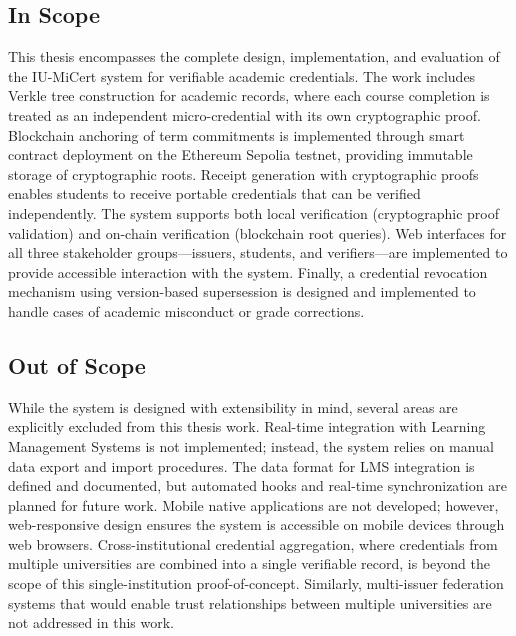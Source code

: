 \subsection{In Scope}
This thesis encompasses the complete design, implementation, and evaluation of the IU-MiCert system for verifiable academic credentials. The work includes Verkle tree construction for academic records, where each course completion is treated as an independent micro-credential with its own cryptographic proof. Blockchain anchoring of term commitments is implemented through smart contract deployment on the Ethereum Sepolia testnet, providing immutable storage of cryptographic roots. Receipt generation with cryptographic proofs enables students to receive portable credentials that can be verified independently. The system supports both local verification (cryptographic proof validation) and on-chain verification (blockchain root queries). Web interfaces for all three stakeholder groups—issuers, students, and verifiers—are implemented to provide accessible interaction with the system. Finally, a credential revocation mechanism using version-based supersession is designed and implemented to handle cases of academic misconduct or grade corrections.

\subsection{Out of Scope}
While the system is designed with extensibility in mind, several areas are explicitly excluded from this thesis work. Real-time integration with Learning Management Systems is not implemented; instead, the system relies on manual data export and import procedures. The data format for LMS integration is defined and documented, but automated hooks and real-time synchronization are planned for future work. Mobile native applications are not developed; however, web-responsive design ensures the system is accessible on mobile devices through web browsers. Cross-institutional credential aggregation, where credentials from multiple universities are combined into a single verifiable record, is beyond the scope of this single-institution proof-of-concept. Similarly, multi-issuer federation systems that would enable trust relationships between multiple universities are not addressed in this work.

